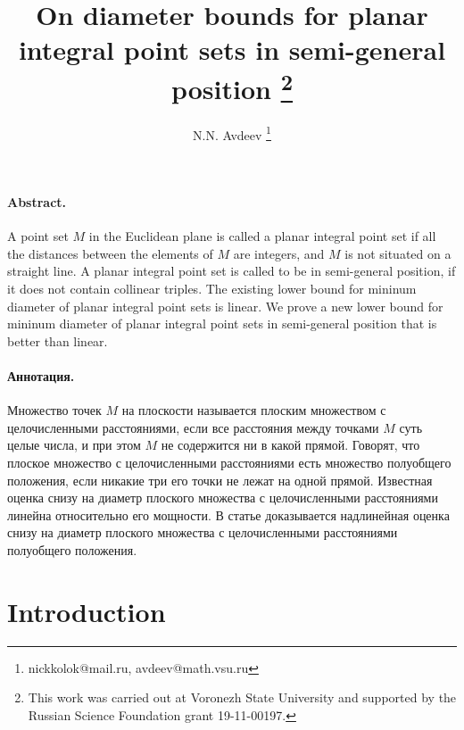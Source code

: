 \documentclass[a4paper,14pt]{article} %
\theoremstyle{plain}
\theoremstyle{definition}
\begin{document}

\title{
	On diameter bounds for planar integral point sets in semi-general position
	\footnote{
		This work was carried out at Voronezh State University and supported by the Russian Science
		Foundation grant 19-11-00197.
	}
}

\author{
	N.N. Avdeev
	\footnote{nickkolok@mail.ru, avdeev@math.vsu.ru}
}

\maketitle

\paragraph{Abstract.}
A point set $M$ in the Euclidean plane is called a planar integral point set if all the distances between the
elements of $M$ are integers, and $M$ is not situated on a straight line.
A planar integral point set is called to be in semi-general position, if it does not contain collinear triples.
The existing lower bound for mininum diameter of planar integral point sets is linear.
We prove a new lower bound for mininum diameter of planar integral point sets in semi-general position
that is better than linear.



\paragraph{Аннотация.}
Множество точек $M$ на плоскости называется плоским множеством с целочисленными расстояниями,
если все расстояния между точками $M$ суть целые числа,
и при этом $M$ не содержится ни в какой прямой.
Говорят, что плоское множество с целочисленными расстояниями есть множество полуобщего положения,
если никакие три его точки не лежат на одной прямой.
Известная оценка снизу на диаметр плоского множества с целочисленными расстояниями
линейна относительно его мощности.
В статье доказывается надлинейная оценка снизу
на диаметр плоского множества с целочисленными расстояниями полуобщего положения.






\section{Introduction}
\end{document}
